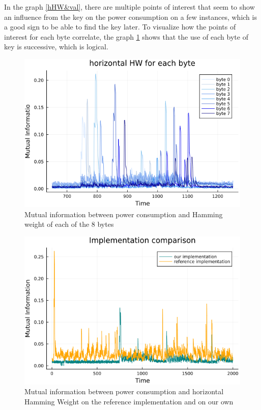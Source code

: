 \documentclass[11pt,technote]{IEEEtran}
\begin{document}
		In the graph \ref{hHW&val}, there are multiple points of interest that seem to show an influence from the key on the power consumption on a few instances, which is a good sign to be able to find the key later. To visualize how the points of interest for each byte correlate, the graph \ref{hHW8_zoom} shows that the use of each byte of key is successive, which is logical. 
		
		\begin{figure}[h]
			\centering
			\includegraphics[scale=0.4]{img_files/hHW_8_bytes_zoom}
			\caption{Mutual information between power consumption and Hamming weight of each of the 8 bytes}
			\label{hHW8_zoom}
		\end{figure}

		\begin{figure}[h]
			\centering
			\includegraphics[scale=0.4]{img_files/comp_ref_hHW}
			\caption{Mutual information between power consumption and horizontal Hamming Weight on the reference implementation and on our own}
			\label{compref}
		\end{figure}
		
\end{document}
